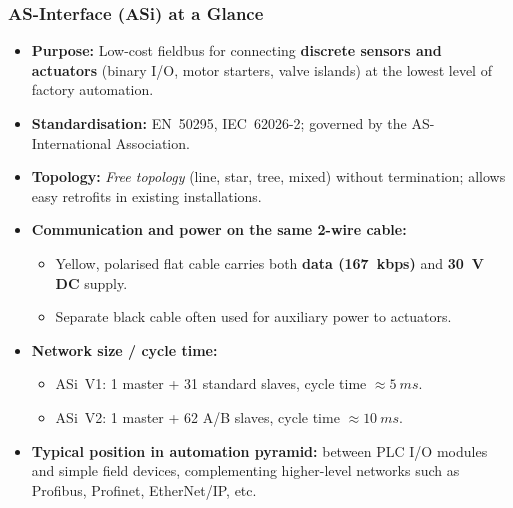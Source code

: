 \begin{frame}
	\frametitle{AS-Interface (ASi) at a Glance}
	\begin{itemize}
		\item \textbf{Purpose:} Low-cost fieldbus for connecting \textbf{discrete sensors and actuators}
			(binary I/O, motor starters, valve islands) at the lowest level of factory automation.
		\item \textbf{Standardisation:} EN~50295, IEC~62026-2; governed by the AS-International Association.
		\item \textbf{Topology:} \emph{Free topology} (line, star, tree, mixed) without termination;
			allows easy retrofits in existing installations.
		\item \textbf{Communication and power on the same 2-wire cable:}
		\begin{itemize}
			\item Yellow, polarised flat cable carries both \textbf{data (\SI{167}{kbps})} and \textbf{30~V DC} supply.
			\item Separate black cable often used for auxiliary power to actuators.
		\end{itemize}
		\item \textbf{Network size / cycle time:}
		\begin{itemize}
			\item ASi~V1: 1 master + 31 standard slaves, cycle time $\approx \SI{5}{ms}$.
			\item ASi~V2: 1 master + 62 A/B slaves, cycle time $\approx \SI{10}{ms}$.
		\end{itemize}
		\item \textbf{Typical position in automation pyramid:}
			between PLC I/O modules and simple field devices, complementing higher-level networks
			such as Profibus, Profinet, EtherNet/IP, etc.
	\end{itemize}
\end{frame}

